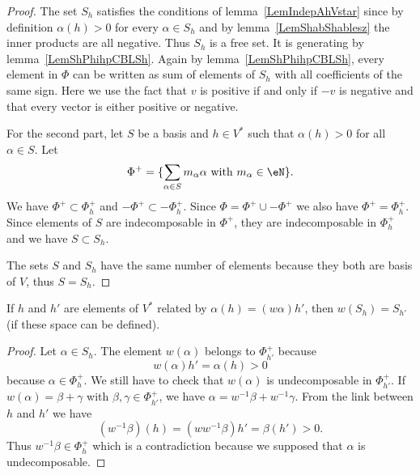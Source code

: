\begin{proof}
	The set \( S_h\) satisfies the conditions of lemma~\ref{LemIndepAhVstar} since by definition \( \alpha(h)>0\) for every \( \alpha\in S_h\) and by lemma~\ref{LemShabShablesz} the inner products are all negative. Thus \( S_h\) is a free set. It is generating by lemma~\ref{LemShPhihpCBLSh}. Again by lemma~\ref{LemShPhihpCBLSh}, every element in \( \Phi\) can be written as sum of elements of \( S_h\) with all coefficients of the same sign. Here we use the fact that \( v\) is positive if and only if \( -v\) is negative and that every vector is either positive or negative.

	For the second part, let \( S\) be a basis and \( h\in V^*\) such that \( \alpha(h)>0\) for all \( \alpha\in S\). Let
	\begin{equation}
		\Phi^+=\{ \sum_{\alpha\in S}m_{\alpha}\alpha \text{ with } m_{\alpha}\in\eN \}.
	\end{equation}
	We have \( \Phi^+\subset\Phi_h^+\) and \( -\Phi^+\subset -\Phi_h^+\). Since \( \Phi=\Phi^+\cup-\Phi^+\) we also have \( \Phi^+=\Phi_h^+\). Since elements of \( S\) are indecomposable in \( \Phi^+\), they are indecomposable in \( \Phi^+_h\) and we have \( S\subset S_h\).

	The sets \( S\) and \( S_h\) have the same number of elements because they both are basis of \( V\), thus \( S=S_h\).
\end{proof}

\begin{lemma}\label{LemwShShpahwahp}
	If \( h\) and \( h'\) are elements of \( V^*\) related by \( \alpha(h)=(w\alpha)h'\), then \( w(S_h)=S_{h'}\) (if these space can be defined).
\end{lemma}

\begin{proof}
	Let \( \alpha\in S_h\). The element \( w(\alpha)\) belongs to \( \Phi_{h'}^+\) because
	\begin{equation}
		w(\alpha)h'=\alpha(h)>0
	\end{equation}
	because \( \alpha\in\Phi_h^+\). We still have to check that \( w(\alpha)\) is undecomposable in \( \Phi_{h'}^+\). If \( w(\alpha)=\beta+\gamma\) with \( \beta,\gamma\in\Phi_{h'}^+\), we have \( \alpha=w^{-1}\beta+w^{-1}\gamma\). From the link between \( h\) and \( h'\) we have
	\begin{equation}
		(w^{-1}\beta)(h)=(ww^{-1}\beta)h'=\beta(h')>0.
	\end{equation}
	Thus \( w^{-1}\beta\in \Phi_h^+\) which is a contradiction because we supposed that \( \alpha\) is undecomposable.
\end{proof}

